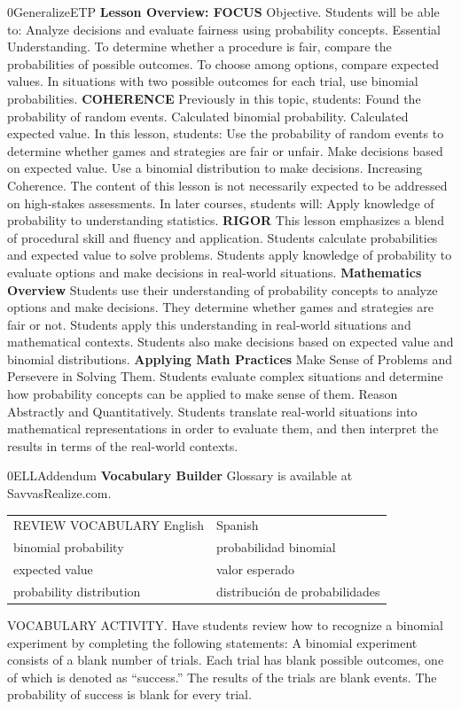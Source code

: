 \documentclass{article}
\newenvironment{te-addendum}[2]{}{}     %
\newcommand{\answer}[1]{}               %
\newcommand{\te}[1]{}                   %
\begin{document}
\begin{te-addendum}{0}{GeneralizeETP}
\textbf{Lesson Overview: FOCUS}
Objective. Students will be able to: Analyze decisions and evaluate fairness using probability concepts.
Essential Understanding. To determine whether a procedure is fair, compare the probabilities of possible outcomes. To choose among options, compare expected values. In situations with two possible outcomes for each trial, use binomial probabilities.
\textbf{COHERENCE}
Previously in this topic, students: Found the probability of random events. Calculated binomial probability. Calculated expected value.
In this lesson, students: Use the probability of random events to determine whether games and strategies are fair or unfair. Make decisions based on expected value. Use a binomial distribution to make decisions.
Increasing Coherence. The content of this lesson is not necessarily expected to be addressed on high-stakes assessments.
In later courses, students will: Apply knowledge of probability to understanding statistics.
\textbf{RIGOR}
This lesson emphasizes a blend of procedural skill and fluency and application.
Students calculate probabilities and expected value to solve problems.
Students apply knowledge of probability to evaluate options and make decisions in real-world situations.
\textbf{Mathematics Overview}
Students use their understanding of probability concepts to analyze options and make decisions. They determine whether games and strategies are fair or not. Students apply this understanding in real-world situations and mathematical contexts.
Students also make decisions based on expected value and binomial distributions.
\textbf{Applying Math Practices}
Make Sense of Problems and Persevere in Solving Them. Students evaluate complex situations and determine how probability concepts can be applied to make sense of them.
Reason Abstractly and Quantitatively. Students translate real-world situations into mathematical representations in order to evaluate them, and then interpret the results in terms of the real-world contexts.
\te{Program Resources. SavvasRealize.com.}
\end{te-addendum}
\begin{te-addendum}{0}{ELLAddendum}
\textbf{Vocabulary Builder}
Glossary is available at SavvasRealize.com.
\begin{tabular}{ll}
REVIEW VOCABULARY English & Spanish \\
binomial probability & probabilidad binomial \\
expected value & valor esperado \\
probability distribution & distribución de probabilidades \\
\end{tabular}
VOCABULARY ACTIVITY. Have students review how to recognize a binomial experiment by completing the following statements:
A binomial experiment consists of a blank number of trials. \answer{fixed}
Each trial has blank possible outcomes, one of which is denoted as ``success.'' \answer{two}
The results of the trials are blank events. \answer{independent}
The probability of success is blank for every trial. \answer{the same}
\end{te-addendum}
\end{document}
